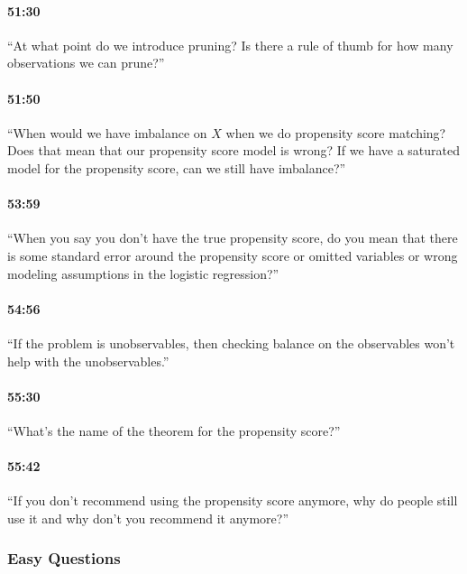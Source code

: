 \documentclass[11pt]{article}
\begin{document}
\paragraph{51:30} ``At what point do we introduce pruning?  Is there a rule of thumb for how many observations we can prune?''

\paragraph{51:50} ``When would we have imbalance on $X$ when we do propensity score matching?  Does that mean that our propensity score model is wrong?  If we have a saturated model for the propensity score, can we still have imbalance?''

\paragraph{53:59} ``When you say you don't have the true propensity score, do you mean that there is some standard error around the propensity score or omitted variables or wrong modeling assumptions in the logistic regression?''

\paragraph{54:56} ``If the problem is unobservables, then checking balance on the observables won't help with the unobservables.''

\paragraph{55:30} ``What's the name of the theorem for the propensity score?''

\paragraph{55:42} ``If you don't recommend using the propensity score anymore, why do people still use it and why don't you recommend it anymore?''


\subsubsection{Easy Questions}
\end{document}
